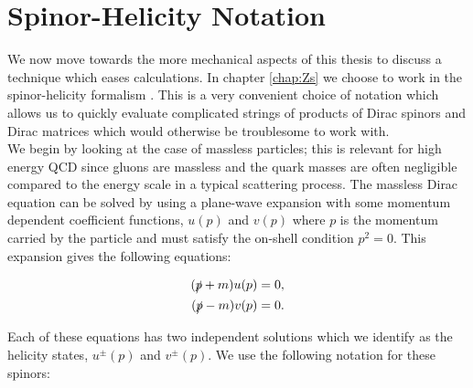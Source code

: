 

\section{Spinor-Helicity Notation}
	\label{sec:SpinorHelicity}

	We now move towards the more mechanical aspects of this thesis to discuss a technique which eases calculations.
	In chapter \ref{chap:Zs} we choose to work in the spinor-helicity formalism \cite{Dixon:1996wi,CBO9781107706620A004}.
	This is a very convenient choice of notation which allows us to quickly evaluate complicated strings of products of
	Dirac spinors and Dirac matrices which would otherwise be troublesome to work with.\\We begin by looking at the case
	of massless particles; this is relevant for high energy QCD since gluons are massless and the quark masses are often
	negligible compared to the energy scale in a typical scattering process.  The massless Dirac equation can be solved
	by using a plane-wave expansion with some momentum dependent coefficient functions, $u(p)$ and $v(p)$ where $p$ is the
	momentum carried by the particle and must satisfy the on-shell condition $p^2=0$.  This expansion gives the following
	equations:

	\begin{align}
	\begin{split}
		(\slashed p + m)u(p) = 0, \\
		(\slashed p - m)v(p) = 0.
	\end{split}
	\end{align}

	Each of these equations has two independent solutions which we identify as the helicity states, $u^\pm(p)$ and $v^\pm(p)$.
	We use the following notation for these spinors:

